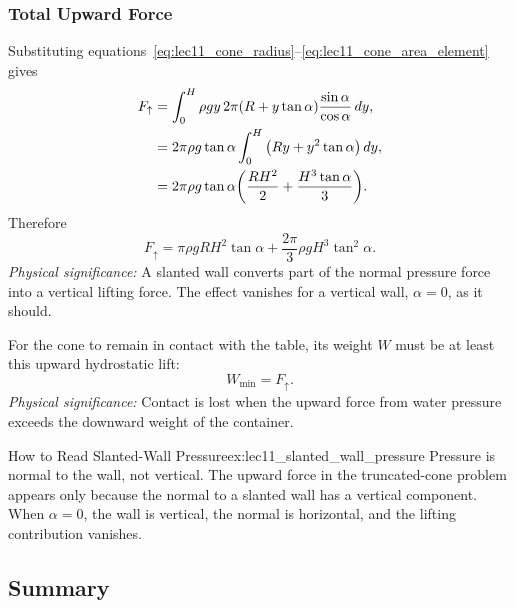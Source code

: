 \documentclass[../main.tex]{subfiles}
\begin{document}
\subsubsection{Total Upward Force}\label{subsec:lec11:cone-total-force}
Substituting equations~\eqref{eq:lec11_cone_radius}--\eqref{eq:lec11_cone_area_element} gives
\begin{align}
  F_{\uparrow}
  &=
  \int_0^H
  \rho g y\,
  2\pi\qty(R+y\tan\alpha)
  \frac{\sin\alpha}{\cos\alpha}\,dy,
  \label{eq:lec11_cone_lift_int_1}\\
  &=
  2\pi\rho g\tan\alpha
  \int_0^H
  \qty(Ry+y^2\tan\alpha)\,dy,
  \label{eq:lec11_cone_lift_int_2}\\
  &=
  2\pi\rho g\tan\alpha
  \qty(
    \frac{RH^2}{2}
    +
    \frac{H^3\tan\alpha}{3}
  ).
  \label{eq:lec11_cone_lift_int_3}
\end{align}
Therefore
\begin{equation}
  \boxed{
  F_{\uparrow}
  =
  \pi\rho g RH^2\tan\alpha
  +
  \frac{2\pi}{3}\rho gH^3\tan^2\alpha.}
  \label{eq:lec11_cone_lift_result}
\end{equation}
\textit{Physical significance:} A slanted wall converts part of the normal pressure force into a vertical lifting force. The effect vanishes for a vertical wall, $\alpha=0$, as it should.

For the cone to remain in contact with the table, its weight $W$ must be at least this upward hydrostatic lift:
\begin{equation}
  \boxed{W_{\min}=F_{\uparrow}.}
  \label{eq:lec11_cone_min_weight}
\end{equation}
\textit{Physical significance:} Contact is lost when the upward force from water pressure exceeds the downward weight of the container.

\begin{Example}{How to Read Slanted-Wall Pressure}{ex:lec11_slanted_wall_pressure}
Pressure is normal to the wall, not vertical. The upward force in the truncated-cone problem appears only because the normal to a slanted wall has a vertical component. When $\alpha=0$, the wall is vertical, the normal is horizontal, and the lifting contribution vanishes.
\end{Example}

\subsection{Summary}\label{sec:lec11:summary}
\end{document}
